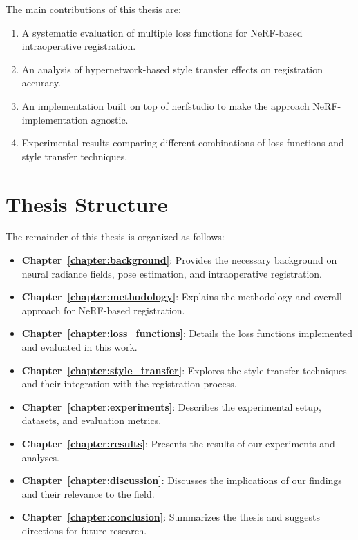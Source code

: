 The main contributions of this thesis are:

\begin{enumerate}
    \item A systematic evaluation of multiple loss functions for NeRF-based intraoperative registration.
    \item An analysis of hypernetwork-based style transfer effects on registration accuracy.
    \item An implementation built on top of nerfstudio to make the approach NeRF-implementation agnostic.
    \item Experimental results comparing different combinations of loss functions and style transfer techniques.
\end{enumerate}

\section{Thesis Structure}

The remainder of this thesis is organized as follows:

\begin{itemize}
    \item \textbf{Chapter~\ref{chapter:background}}: Provides the necessary background on neural radiance fields, pose estimation, and intraoperative registration.
    \item \textbf{Chapter~\ref{chapter:methodology}}: Explains the methodology and overall approach for NeRF-based registration.
    \item \textbf{Chapter~\ref{chapter:loss_functions}}: Details the loss functions implemented and evaluated in this work.
    \item \textbf{Chapter~\ref{chapter:style_transfer}}: Explores the style transfer techniques and their integration with the registration process.
    \item \textbf{Chapter~\ref{chapter:experiments}}: Describes the experimental setup, datasets, and evaluation metrics.
    \item \textbf{Chapter~\ref{chapter:results}}: Presents the results of our experiments and analyses.
    \item \textbf{Chapter~\ref{chapter:discussion}}: Discusses the implications of our findings and their relevance to the field.
    \item \textbf{Chapter~\ref{chapter:conclusion}}: Summarizes the thesis and suggests directions for future research.
\end{itemize}

